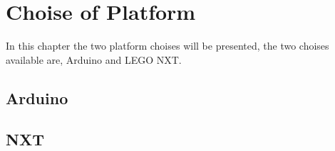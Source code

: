\chapter{Choise of Platform}
In this chapter the two platform choises will be presented, the two choises
available are, Arduino and LEGO NXT. 
\section{Arduino}


\section{NXT}



